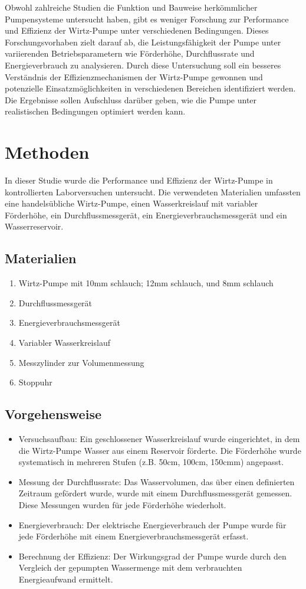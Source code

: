 \documentclass[12pt]{article}
\begin{document}
Obwohl zahlreiche Studien die Funktion und Bauweise herkömmlicher Pumpensysteme untersucht haben, gibt es weniger Forschung zur Performance und Effizienz der Wirtz-Pumpe unter verschiedenen Bedingungen. Dieses Forschungsvorhaben zielt darauf ab, die Leistungsfähigkeit der Pumpe unter variierenden Betriebsparametern wie Förderhöhe, Durchflussrate und Energieverbrauch zu analysieren. Durch diese Untersuchung soll ein besseres Verständnis der Effizienzmechanismen der Wirtz-Pumpe gewonnen und potenzielle Einsatzmöglichkeiten in verschiedenen Bereichen identifiziert werden. Die Ergebnisse sollen Aufschluss darüber geben, wie die Pumpe unter realistischen Bedingungen optimiert werden kann.

\section{Methoden}
In dieser Studie wurde die Performance und Effizienz der Wirtz-Pumpe in kontrollierten Laborversuchen untersucht. Die verwendeten Materialien umfassten eine handelsübliche Wirtz-Pumpe, einen Wasserkreislauf mit variabler Förderhöhe, ein Durchflussmessgerät, ein Energieverbrauchsmessgerät und ein Wasserreservoir.

\subsection{Materialien}
\begin{enumerate}
\item Wirtz-Pumpe mit 10mm schlauch; 12mm schlauch, und 8mm schlauch
\item Durchflussmessgerät
\item Energieverbrauchsmessgerät
\item Variabler Wasserkreislauf
\item Messzylinder zur Volumenmessung
\item Stoppuhr
\end{enumerate}

\subsection{Vorgehensweise}
\begin{itemize}
\item Versuchsaufbau: Ein geschlossener Wasserkreislauf wurde eingerichtet, in dem die Wirtz-Pumpe Wasser aus einem Reservoir förderte. Die Förderhöhe wurde systematisch in mehreren Stufen (z.B. 50cm, 100cm, 150cmm) angepasst.
\item Messung der Durchflussrate: Das Wasservolumen, das über einen definierten Zeitraum gefördert wurde, wurde mit einem Durchflussmessgerät gemessen. Diese Messungen wurden für jede Förderhöhe wiederholt.
\item Energieverbrauch: Der elektrische Energieverbrauch der Pumpe wurde für jede Förderhöhe mit einem Energieverbrauchsmessgerät erfasst.
\item Berechnung der Effizienz: Der Wirkungsgrad der Pumpe wurde durch den Vergleich der gepumpten Wassermenge mit dem verbrauchten Energieaufwand ermittelt.
\end{itemize}
\end{document}
